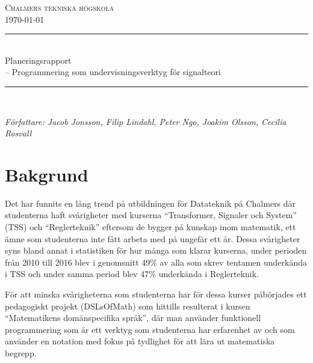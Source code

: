 \documentclass{article}
\begin{document}
\begin{titlepage} \newcommand{\HRule}{\rule{\linewidth}{0.3mm}}
\center
\textsc{\Large Chalmers tekniska högskola}\\[0.05cm] %
\normalsize \today

\HRule \\[0.08cm]
{ \large Planeringsrapport \\ \normalsize{-- Programmering som undervisningsverktyg för signalteori}}\\[0.08cm]
\HRule \\[0.3cm]

\begin{minipage}{0.5\textwidth}
\begin{flushleft} \small
\emph{Författare: Jacob Jonsson, Filip Lindahl, Peter Ngo, Joakim Olsson, Cecilia Rosvall}
\end{flushleft}

\end{minipage}


\end{titlepage}


\section{Bakgrund}
Det har funnits en lång trend på utbildningen för Datateknik på
Chalmers där studenterna haft svårigheter med kurserna “Transformer,
Signaler och System” (TSS) och “Reglerteknik”
eftersom de bygger på kunskap inom matematik, ett ämne som studenterna
inte fått arbeta med på ungefär ett år.
%
Dessa svårigheter syns bland annat i statistiken för hur många som
klarar kurserna, under perioden från 2010 till 2016 blev i genomsnitt
49\% av alla som skrev tentamen underkända i TSS och under samma
period blev 47\% underkända i Reglerteknik.

För att minska svårigheterna som studenterna har för dessa kurser
påbörjades ett pedagogiskt projekt (DSLsOfMath) som hittills
resulterat i kursen “Matematikens domänspecifika språk”, där man
använder funktionell programmering som är ett verktyg som
studenterna har erfarenhet av och som använder en notation med
fokus på tydlighet för att lära ut matematiska begrepp.
\end{document}
